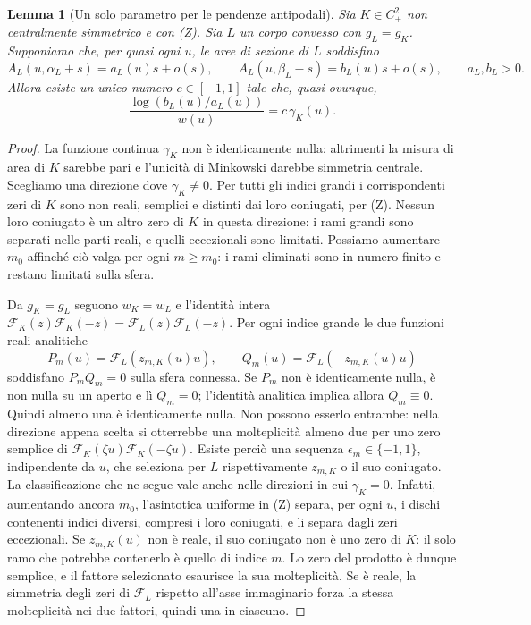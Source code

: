 \documentclass[11pt,a4paper]{article}
\newtheorem{lemma}[theorem]{Lemma}
\theoremstyle{remark}
\begin{document}
\begin{lemma}[Un solo parametro per le pendenze antipodali]\label{lem:mean}
Sia $K\in C^2_+$ non centralmente simmetrico e con (Z). Sia $L$ un
corpo convesso con $g_L=g_K$. Supponiamo che, per quasi ogni $u$, le
aree di sezione di $L$ soddisfino
\begin{equation}\label{eq:linearends}
A_L(u,\alpha_L+s)=a_L(u)s+o(s),\qquad
A_L(u,\beta_L-s)=b_L(u)s+o(s),\qquad a_L,b_L>0.
\end{equation}
Allora esiste un unico numero $c\in[-1,1]$ tale che, quasi ovunque,
\begin{equation}\label{eq:scalartransport}
\frac{\log(b_L(u)/a_L(u))}{w(u)}=c\,\gamma_K(u).
\end{equation}
\end{lemma}
\begin{proof}
La funzione continua $\gamma_K$ non è identicamente nulla: altrimenti
la misura di area di $K$ sarebbe pari e l'unicità di Minkowski darebbe
simmetria centrale. Scegliamo una direzione dove $\gamma_K\ne0$.
Per tutti gli indici grandi i corrispondenti zeri di $K$ sono non reali,
semplici e distinti dai loro coniugati, per (Z). Nessun loro coniugato
è un altro zero di $K$ in questa direzione: i rami grandi sono
separati nelle parti reali, e quelli eccezionali sono limitati.
Possiamo aumentare $m_0$ affinché ciò valga per ogni $m\geq m_0$:
i rami eliminati sono in numero finito e restano limitati sulla sfera.

Da $g_K=g_L$ seguono $w_K=w_L$ e l'identità intera
$\mathcal F_K(z)\mathcal F_K(-z)=\mathcal F_L(z)\mathcal F_L(-z)$.
Per ogni indice grande le due funzioni reali analitiche
\[
P_m(u)=\mathcal F_L(z_{m,K}(u)u),\qquad
Q_m(u)=\mathcal F_L(-z_{m,K}(u)u)
\]
soddisfano $P_mQ_m=0$ sulla sfera connessa. Se $P_m$ non è
identicamente nulla, è non nulla su un aperto e lì $Q_m=0$;
l'identità analitica implica allora $Q_m\equiv0$. Quindi almeno una
è identicamente nulla. Non possono esserlo entrambe: nella direzione
appena scelta si otterrebbe una molteplicità almeno due per uno zero
semplice di $\mathcal F_K(\zeta u)\mathcal F_K(-\zeta u)$.
Esiste perciò una sequenza $\epsilon_m\in\{-1,1\}$, indipendente da
$u$, che seleziona per $L$ rispettivamente $z_{m,K}$ o il suo coniugato.
La classificazione che ne segue vale anche nelle direzioni in cui
$\gamma_K=0$. Infatti, aumentando ancora $m_0$, l'asintotica uniforme
in (Z) separa, per ogni $u$, i dischi contenenti indici diversi,
compresi i loro coniugati, e li separa dagli zeri eccezionali.
Se $z_{m,K}(u)$ non è reale, il suo coniugato non è uno zero di $K$:
il solo ramo che potrebbe contenerlo è quello di indice $m$.
Lo zero del prodotto è dunque semplice, e il fattore selezionato
esaurisce la sua molteplicità. Se è reale, la simmetria degli zeri
di $\mathcal F_L$ rispetto all'asse immaginario forza la stessa
molteplicità nei due fattori, quindi una in ciascuno.


\end{proof}
\end{document}
